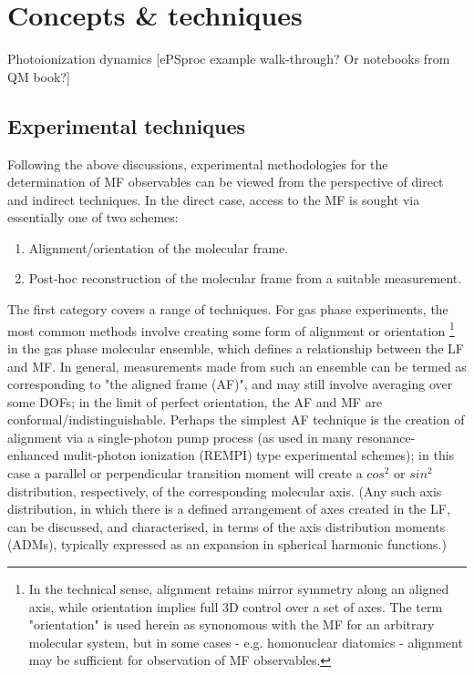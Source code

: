 \section{Concepts \& techniques}

Photoionization dynamics [ePSproc example walk-through? Or notebooks from QM book?]

\subsection{Experimental techniques}

Following the above discussions, experimental methodologies for the determination of MF observables can be viewed from the perspective of direct and indirect techniques. In the direct case, access to the MF is sought via essentially one of two schemes:

\begin{enumerate}
\item Alignment/orientation of the molecular frame.
\item Post-hoc reconstruction of the molecular frame from a suitable measurement.
\end{enumerate}

The first category covers a range of techniques. For gas phase experiments, the most common methods involve creating some form of alignment or orientation \footnote{In the technical sense, alignment retains mirror symmetry along an aligned axis, while orientation implies full 3D control over a set of axes. The term "orientation" is used herein as synonomous with the MF for an arbitrary molecular system, but in some cases - e.g. homonuclear diatomics - alignment may be sufficient for observation of MF observables.} in the gas phase molecular ensemble, which defines a relationship between the LF and MF. In general, measurements made from such an ensemble can be termed as corresponding to "the aligned frame (AF)", and may still involve averaging over some DOFs; in the limit of perfect orientation, the AF and MF are conformal/indistinguishable. Perhaps the simplest AF technique is the creation of alignment via a single-photon pump process (as used in many resonance-enhanced mulit-photon ionization (REMPI) type experimental schemes); in this case a parallel or perpendicular transition moment will create a $cos^2$ or $sin^2$ distribution, respectively, of the corresponding molecular axis. (Any such axis distribution, in which there is a defined arrangement of axes created in the LF, can be discussed, and characterised, in terms of the axis distribution moments (ADMs), typically expressed as an expansion in spherical harmonic functions.)

